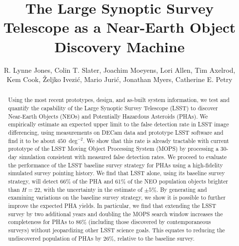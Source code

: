 \documentclass[12pt,preprint]{aastex}
\begin{document}
\title{The Large Synoptic Survey Telescope as a Near-Earth Object Discovery Machine}

\author{R. Lynne Jones,
Colin T. Slater,
Joachim Moeyens,
Lori Allen,
Tim Axelrod,
Kem Cook,
\v{Z}eljko Ivezi\'{c},
Mario Juri\'{c},
Jonathan Myers,
Catherine E. Petry
}

\begin{abstract}
Using the most recent prototypes, design, and as-built system information, we test and quantify the capability of the Large Synoptic Survey Telescope (LSST) to discover Near-Earth Objects (NEOs) and Potentially Hazardous Asteroids (PHAs).
We empirically estimate an expected upper limit to the false detection rate in LSST image differencing, using measurements on DECam data and prototype LSST software and find it to be about $450$~deg$^{-2}$. We show that this rate is already tractable with current prototype of the LSST Moving Object Processing System (MOPS) by processing a 30-day simulation consistent with measured false detection rates.
We proceed to evaluate the performance of the LSST baseline survey strategy for  PHAs using a high-fidelity simulated survey pointing history. 
We find that LSST alone, using its baseline survey strategy, will detect 66\% of the PHA and 61\% of the NEO population objects brighter than $H=22$, with the uncertainty in the estimate of $\pm5$\%. By generating and examining variations on the baseline survey strategy, we show it is possible to further improve the expected PHA yields.
In particular, we find that extending the LSST survey by two additional years and doubling the MOPS search window increases the completeness for PHAs to 86\% (including those discovered by contemporaneous surveys) without jeopardizing other LSST science goals. This equates to reducing the undiscovered population of PHAs by 26\%, relative to the baseline survey.
\end{abstract}
\end{document}
